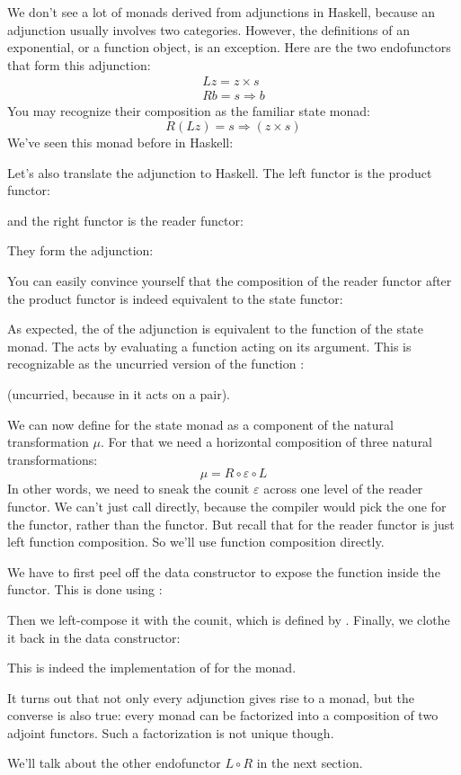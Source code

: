 We don't see a lot of monads derived from adjunctions in Haskell,
because an adjunction usually involves two categories. However, the
definitions of an exponential, or a function object, is an exception.
Here are the two endofunctors that form this adjunction:
\begin{gather*}
  L z = z\times{}s \\
  R b = s \Rightarrow b
\end{gather*}
You may recognize their composition as the familiar state monad:
\[R (L z) = s \Rightarrow (z\times{}s)\]
We've seen this monad before in Haskell:

Let's also translate the adjunction to Haskell. The left functor is the
product functor:

and the right functor is the reader functor:

They form the adjunction:

You can easily convince yourself that the composition of the reader
functor after the product functor is indeed equivalent to the state
functor:

As expected, the  of the adjunction is equivalent to the
 function of the state monad. The  acts by
evaluating a function acting on its argument. This is recognizable as
the uncurried version of the function :

(uncurried, because in  it acts on a pair).

We can now define  for the state monad as a component of
the natural transformation $\mu$. For that we need a horizontal composition
of three natural transformations:
\[\mu = R \circ \varepsilon \circ L\]
In other words, we need to sneak the counit $\varepsilon$ across one level of the
reader functor. We can't just call  directly, because the
compiler would pick the one for the  functor, rather than
the  functor. But recall that  for the
reader functor is just left function composition. So we'll use function
composition directly.

We have to first peel off the data constructor  to expose
the function inside the  functor. This is done using
:

Then we left-compose it with the counit, which is defined by
. Finally, we clothe it back in the
 data constructor:

This is indeed the implementation of  for the
 monad.

It turns out that not only every adjunction gives rise to a monad, but
the converse is also true: every monad can be factorized into a
composition of two adjoint functors. Such a factorization is not unique
though.

We'll talk about the other endofunctor $L \circ R$ in the next
section.
